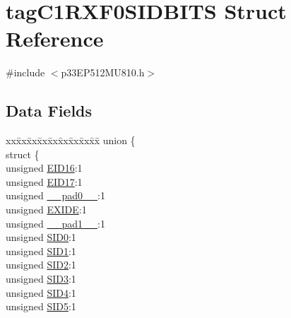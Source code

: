 \hypertarget{structtag_c1_r_x_f0_s_i_d_b_i_t_s}{}\section{tag\+C1\+R\+X\+F0\+S\+I\+D\+B\+I\+TS Struct Reference}
\label{structtag_c1_r_x_f0_s_i_d_b_i_t_s}


{\ttfamily \#include $<$p33\+E\+P512\+M\+U810.\+h$>$}

\subsection*{Data Fields}
\begin{DoxyCompactItemize}
\item 
\begin{tabbing}
xx\=xx\=xx\=xx\=xx\=xx\=xx\=xx\=xx\=\kill
union \{\\
\>struct \{\\
\>\>unsigned \hyperlink{structtag_c1_r_x_f0_s_i_d_b_i_t_s_a6dd5663b0c9838c56db040560ca0efa1}{EID16}:1\\
\>\>unsigned \hyperlink{structtag_c1_r_x_f0_s_i_d_b_i_t_s_aa648615464b0eb29967529333eee9fd9}{EID17}:1\\
\>\>unsigned \hyperlink{structtag_c1_r_x_f0_s_i_d_b_i_t_s_adf71f3d8410c1f1dbbc96680a92c49af}{\_\_pad0\_\_}:1\\
\>\>unsigned \hyperlink{structtag_c1_r_x_f0_s_i_d_b_i_t_s_a09ff1c1be3927220bd3dfbc10edfe243}{EXIDE}:1\\
\>\>unsigned \hyperlink{structtag_c1_r_x_f0_s_i_d_b_i_t_s_acaf2d0924a107ec6e8d2e31febaf66f9}{\_\_pad1\_\_}:1\\
\>\>unsigned \hyperlink{structtag_c1_r_x_f0_s_i_d_b_i_t_s_a1ca276ac15df60e1f7b9a6d0011ade93}{SID0}:1\\
\>\>unsigned \hyperlink{structtag_c1_r_x_f0_s_i_d_b_i_t_s_a3405d354f81391f879648f69f504dfc8}{SID1}:1\\
\>\>unsigned \hyperlink{structtag_c1_r_x_f0_s_i_d_b_i_t_s_ad744966dfc49307f731b7045b01b94e5}{SID2}:1\\
\>\>unsigned \hyperlink{structtag_c1_r_x_f0_s_i_d_b_i_t_s_a9345f3e64720be93e83d8dfc827f3f45}{SID3}:1\\
\>\>unsigned \hyperlink{structtag_c1_r_x_f0_s_i_d_b_i_t_s_aefb106fed4bb40e2c3c71ac612c554e3}{SID4}:1\\
\>\>unsigned \hyperlink{structtag_c1_r_x_f0_s_i_d_b_i_t_s_a0f221b3c9612231686bf87ccdcec8489}{SID5}:1\\

\end{tabbing}
\end{DoxyCompactItemize}
